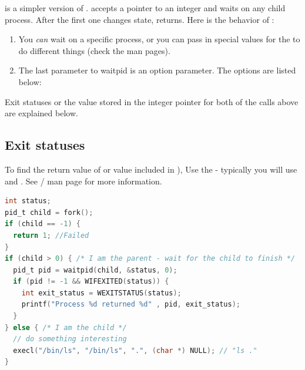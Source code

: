  is a simpler version of .
 accepts a pointer to an integer and waits on any child process.
After the first one changes state,  returns.
Here is the behavior of :

\begin{enumerate}
\item You \emph{can} wait on a specific process, or you can pass in special values for the  to do different things (check the man pages).
\item The last parameter to waitpid is an option parameter.
The options are listed below:
\end{enumerate}

Exit statuses or the value stored in the integer pointer for both of the calls above are explained below.

\subsection{Exit statuses}

To find the return value of  or value included in ), Use the  - typically you will use  and  .
See / man page for more information.

\begin{lstlisting}[language=C]
int status;
pid_t child = fork();
if (child == -1) {
  return 1; //Failed
}
if (child > 0) { /* I am the parent - wait for the child to finish */
  pid_t pid = waitpid(child, &status, 0);
  if (pid != -1 && WIFEXITED(status)) {
    int exit_status = WEXITSTATUS(status);
    printf("Process %d returned %d" , pid, exit_status);
  }
} else { /* I am the child */
  // do something interesting
  execl("/bin/ls", "/bin/ls", ".", (char *) NULL); // "ls ."
}
\end{lstlisting}

